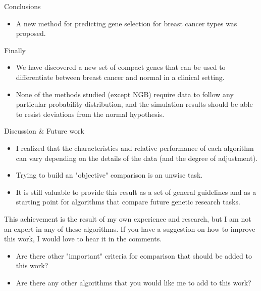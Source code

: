 \documentclass[xcolor=table]{beamer}
\numberwithin{figure}{section}
\numberwithin{equation}{section}
\begin{document}
\begin{frame}[allowframebreaks]{Conclusions}
\framebreak
  \begin{itemize}
    \item A new method for predicting gene selection for breast cancer types was proposed.
   \end{itemize}
  Finally
  \begin{itemize}
      \item We have discovered a new set of compact genes that can be used to differentiate between breast cancer and normal in a clinical setting.
  \item None of the methods studied (except NGB) require data to follow any particular probability distribution, and the simulation results should be able to resist deviations from the normal hypothesis.
 \end{itemize}
 \end{frame}

\begin{frame}[allowframebreaks]{Discussion \& Future work}
    \begin{itemize}
        \item I realized that the characteristics and relative performance of each algorithm can vary depending on the details of the data (and the degree of adjustment).
        \item Trying to build an "objective" comparison is an unwise task.
        \item It is still valuable to provide this result as a set of general guidelines and as a starting point for algorithms that compare future genetic research tasks.
    \end{itemize}
\framebreak
    This achievement is the result of my own experience and research, but I am not an expert in any of these algorithms. If you have a suggestion on how to improve this work, I would love to hear it in the comments.
\begin{itemize}
    \item Are there other "important" criteria for comparison that should be added to this work?
    \item Are there any other algorithms that you would like me to add to this work? 
\end{itemize}
\end{frame}

\ThankYouFrame

\end{document}
